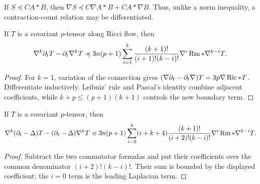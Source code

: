 \begin{remark}
\label{rem:chow-ii-differentiable-contraction-count}

If \(S\preccurlyeq C A*B\), then
\(\nabla S\preccurlyeq C\nabla A*B+C A*\nabla B\).  Thus, unlike a norm
inequality, a contraction-count relation may be differentiated.
\end{remark}

\begin{lemma}
\label{lem:chow-ii-nabla-time-commutator}

If \(T\) is a covariant \(p\)-tensor along Ricci flow, then
\[
 \nabla^k\partial_tT-\partial_t\nabla^kT
 \preccurlyeq3n(p+1)\sum_{i=1}^k
 \frac{(k+1)!}{(i+1)!(k-i)!}\nabla^i\operatorname{Rm}*\nabla^{k-i}T.
\]
\end{lemma}
\begin{proof}
\sketch
For \(k=1\), variation of the connection gives
\((\nabla\partial_t-\partial_t\nabla)T=3p\nabla\operatorname{Ric}*T\).  Differentiate
inductively.  Leibniz' rule and Pascal's identity combine adjacent
coefficients, while \(k+p\leq(p+1)(k+1)\) controls the new boundary term.
\end{proof}

\begin{corollary}
\label{cor:chow-ii-nabla-heat-commutator}

If \(T\) is a covariant \(p\)-tensor, then
\[
 \nabla^k(\partial_t-\Delta)T-(\partial_t-\Delta)\nabla^kT
 \preccurlyeq3n(p+1)\sum_{i=0}^k(i+k+4)
 \frac{(k+1)!}{(i+2)!(k-i)!}\nabla^i\operatorname{Rm}*\nabla^{k-i}T.
\]
\end{corollary}
\begin{proof}
\sketch
{}
Subtract the two commutator formulas and put their coefficients over the
common denominator \((i+2)!(k-i)!\).  Their sum is bounded by the displayed
coefficient; the \(i=0\) term is the leading Laplacian term.
\end{proof}

